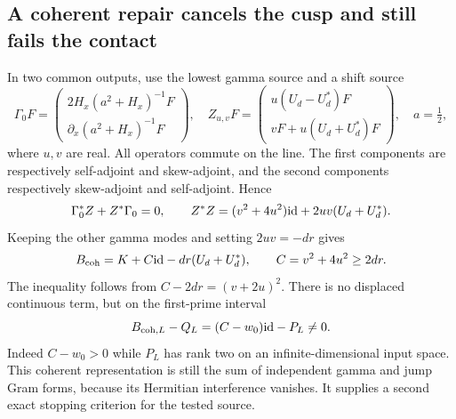 \subsection{A coherent repair cancels the cusp and still fails the contact}
In two common outputs, use the lowest gamma source and a shift source
\begin{equation}\label{eq:coherent-sources}
 \Gamma_0F=\begin{pmatrix}
  2H_x(a^2+H_x)^{-1}F\\ \partial_x(a^2+H_x)^{-1}F
 \end{pmatrix},\quad
 Z_{u,v}F=\begin{pmatrix}
 u(U_d-U_d^*)F\\vF+u(U_d+U_d^*)F
 \end{pmatrix},\quad a=\tfrac12,
\end{equation}
where $u,v$ are real. All operators commute on the line. The first
components are respectively self-adjoint and skew-adjoint, and the
second components respectively skew-adjoint and self-adjoint. Hence
\begin{equation}\label{eq:coherent-cross}
 \Gamma_0^*Z+Z^*\Gamma_0=0,
 \qquad Z^*Z=(v^2+4u^2)\mathrm{id}+2uv(U_d+U_d^*).
\end{equation}
Keeping the other gamma modes and setting $2uv=-dr$ gives
\begin{equation}\label{eq:coherent-result}
 B_{\rm coh}=K+C\mathrm{id}-dr(U_d+U_d^*),\qquad
 C=v^2+4u^2\geq2dr.
\end{equation}
The inequality follows from $C-2dr=(v+2u)^2$. There is no displaced
continuous term, but on the first-prime interval
\begin{equation}\label{eq:coherent-failure}
 B_{{\rm coh},L}-Q_L=(C-w_0)\mathrm{id}-P_L\ne0.
\end{equation}
Indeed $C-w_0>0$ while $P_L$ has rank two on an infinite-dimensional
input space. This coherent representation is still the sum of independent
gamma and jump Gram forms, because its Hermitian interference vanishes.
It supplies a second exact stopping criterion for the tested source.
